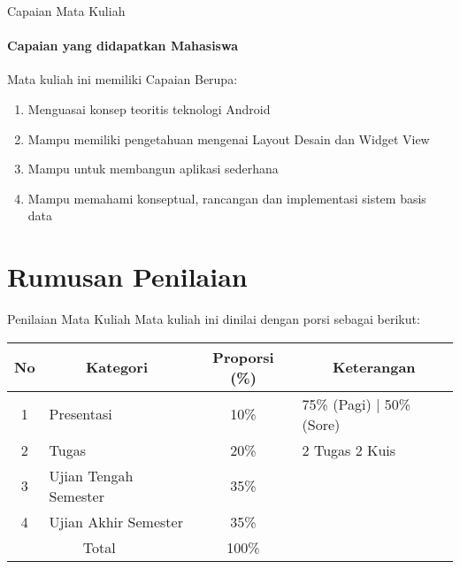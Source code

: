 \documentclass[12pt,hyperref={colorlinks,citecolor=blue,urlcolor=peking_blue,linkcolor=},aspectratio=169]{beamer}
\theoremstyle{plain}
\begin{document}
\begin{frame}{Capaian Mata Kuliah}
	\framesubtitle{Capaian yang didapatkan Mahasiswa}
	\justifying
	Mata kuliah ini memiliki Capaian Berupa:
	\vfill
	\begin{enumerate}
		\justifying
		\item Menguasai konsep teoritis teknologi Android
		\item Mampu memiliki pengetahuan mengenai Layout Desain dan Widget View
		\item Mampu untuk membangun aplikasi sederhana
		\item Mampu memahami konseptual, rancangan dan implementasi sistem basis data
	\end{enumerate}
\end{frame}

\section{Rumusan Penilaian}
\begin{frame}{Penilaian Mata Kuliah}
	Mata kuliah ini dinilai dengan porsi sebagai berikut:
	\vfill
	\begin{table}[]
		\begin{tabular}{clcc}
			\hline
			No & \multicolumn{1}{c}{Kategori} & Proporsi (\%) & Keterangan                                                   \\ \hline
			1  & Presentasi                   & 10\%          & \multicolumn{1}{l}{75\% (Pagi) | 50\% (Sore)} \\
			2  & Tugas                        & 20\%          & \multicolumn{1}{l}{2 Tugas 2 Kuis}                           \\
			3  & Ujian Tengah Semester        & 35\%          &                                                              \\
			4  & Ujian Akhir Semester         & 35\%          &                                                              \\ \hline
			\multicolumn{2}{c}{Total}         & 100\%         &                                                              \\ \hline
		\end{tabular}
	\end{table}	
\end{frame}
\end{document}
